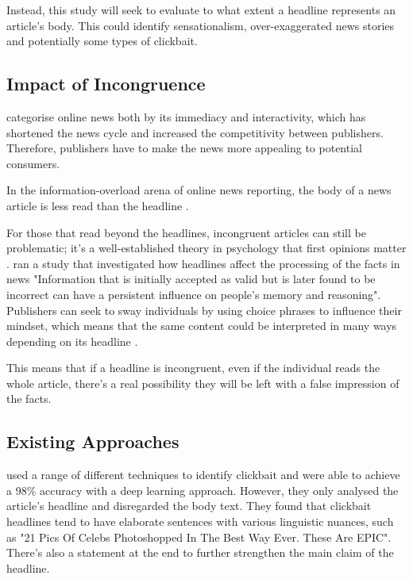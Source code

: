 Instead, this study will seek to evaluate to what extent a headline represents an article's body. This could identify sensationalism, over-exaggerated news stories and potentially some types of clickbait.

\subsection{Impact of Incongruence}
 categorise online news both by its immediacy and interactivity, which has shortened the news cycle and increased the competitivity between publishers. Therefore, publishers have to make the news more appealing to potential consumers.

In the information-overload arena of online news reporting, the body of a news article is less read than the headline \cite{gabielkov2016}.  

For those that read beyond the headlines, incongruent articles can still be problematic; it's a well-established theory in psychology that first opinions matter \cite{digirolamo1997}.  ran a study that investigated how headlines affect the processing of the facts in news "Information that is initially accepted as valid but is later found to be incorrect can have a persistent influence on people’s memory and reasoning". Publishers can seek to sway individuals by using choice phrases to influence their mindset, which means that the same content could be interpreted in many ways depending on its headline \cite{reis2015}.

This means that if a headline is incongruent, even if the individual reads the whole article, there's a real possibility they will be left with a false impression of the facts. 


\subsection{Existing Approaches}

 used a range of different techniques to identify clickbait and were able to achieve a 98\% accuracy with a deep learning approach. However, they only analysed the article's headline and disregarded the body text.  They found that clickbait headlines tend to have elaborate sentences with various linguistic nuances, such as "21 Pics Of Celebs Photoshopped In The Best Way Ever. These Are EPIC". There's also a statement at the end to further strengthen the main claim of the headline.

